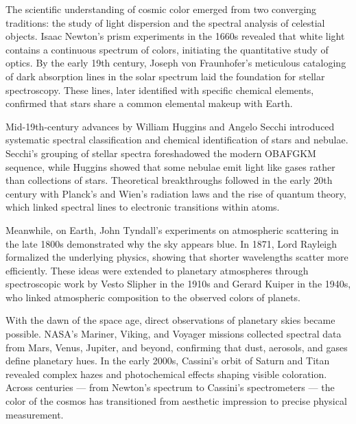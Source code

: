 \begin{historical}
The scientific understanding of cosmic color emerged from two converging traditions: the study of light dispersion and the spectral analysis of celestial objects. Isaac Newton's prism experiments in the 1660s revealed that white light contains a continuous spectrum of colors, initiating the quantitative study of optics. By the early 19th century, Joseph von Fraunhofer's meticulous cataloging of dark absorption lines in the solar spectrum laid the foundation for stellar spectroscopy. These lines, later identified with specific chemical elements, confirmed that stars share a common elemental makeup with Earth.

Mid-19th-century advances by William Huggins and Angelo Secchi introduced systematic spectral classification and chemical identification of stars and nebulae. Secchi's grouping of stellar spectra foreshadowed the modern OBAFGKM sequence, while Huggins showed that some nebulae emit light like gases rather than collections of stars. Theoretical breakthroughs followed in the early 20th century with Planck's and Wien's radiation laws and the rise of quantum theory, which linked spectral lines to electronic transitions within atoms.

Meanwhile, on Earth, John Tyndall's experiments on atmospheric scattering in the late 1800s demonstrated why the sky appears blue. In 1871, Lord Rayleigh formalized the underlying physics, showing that shorter wavelengths scatter more efficiently. These ideas were extended to planetary atmospheres through spectroscopic work by Vesto Slipher in the 1910s and Gerard Kuiper in the 1940s, who linked atmospheric composition to the observed colors of planets.

With the dawn of the space age, direct observations of planetary skies became possible. NASA's Mariner, Viking, and Voyager missions collected spectral data from Mars, Venus, Jupiter, and beyond, confirming that dust, aerosols, and gases define planetary hues. In the early 2000s, Cassini's orbit of Saturn and Titan revealed complex hazes and photochemical effects shaping visible coloration. Across centuries --- from Newton's spectrum to Cassini's spectrometers --- the color of the cosmos has transitioned from aesthetic impression to precise physical measurement.
\end{historical}
